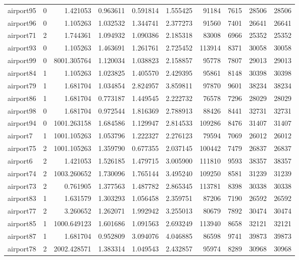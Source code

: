 \begin{longtable}{|l|r|r|r|r|r|r|r|r|r|}
airport95 & 0 & 1.421053 & 0.963611 & 0.591814 & 1.555425 & 91184 & 7615 & 28506 & 28506 \\
airport96 & 0 & 1.105263 & 1.032532 & 1.344741 & 2.377273 & 91560 & 7401 & 26641 & 26641 \\
airport71 & 2 & 1.744361 & 1.094932 & 1.090386 & 2.185318 & 83008 & 6966 & 25352 & 25352 \\
airport93 & 0 & 1.105263 & 1.463691 & 1.261761 & 2.725452 & 113914 & 8371 & 30058 & 30058 \\
airport99 & 0 & 8001.305764 & 1.120034 & 1.038823 & 2.158857 & 95778 & 7807 & 29013 & 29013 \\
airport84 & 1 & 1.105263 & 1.023825 & 1.405570 & 2.429395 & 95861 & 8148 & 30398 & 30398 \\
airport79 & 1 & 1.681704 & 1.034854 & 2.824957 & 3.859811 & 97870 & 9601 & 38234 & 38234 \\
airport86 & 1 & 1.681704 & 0.773187 & 1.449545 & 2.222732 & 76578 & 7296 & 28029 & 28029 \\
airport98 & 0 & 1.681704 & 0.972544 & 1.816369 & 2.788913 & 88426 & 8441 & 32731 & 32731 \\
airport94 & 0 & 1001.263158 & 1.684586 & 1.129947 & 2.814533 & 109286 & 8476 & 31407 & 31407 \\
airport7 & 1 & 1001.105263 & 1.053796 & 1.222327 & 2.276123 & 79594 & 7069 & 26012 & 26012 \\
airport75 & 2 & 1001.105263 & 1.359790 & 0.677355 & 2.037145 & 100442 & 7479 & 26837 & 26837 \\
airport6 & 2 & 1.421053 & 1.526185 & 1.479715 & 3.005900 & 111810 & 9593 & 38357 & 38357 \\
airport74 & 2 & 1003.260652 & 1.730096 & 1.765144 & 3.495240 & 109250 & 8581 & 31239 & 31239 \\
airport73 & 2 & 0.761905 & 1.377563 & 1.487782 & 2.865345 & 113781 & 8398 & 30338 & 30338 \\
airport83 & 1 & 1.631579 & 1.303293 & 1.056458 & 2.359751 & 87206 & 7190 & 26592 & 26592 \\
airport77 & 2 & 3.260652 & 1.262071 & 1.992942 & 3.255013 & 80679 & 7892 & 30474 & 30474 \\
airport85 & 1 & 1000.649123 & 1.601686 & 1.091563 & 2.693249 & 113940 & 8658 & 32121 & 32121 \\
airport87 & 1 & 1.681704 & 0.952809 & 3.094076 & 4.046885 & 86598 & 9741 & 39873 & 39873 \\
airport78 & 2 & 2002.428571 & 1.383314 & 1.049543 & 2.432857 & 95974 & 8289 & 30968 & 30968 \\

\end{longtable}
